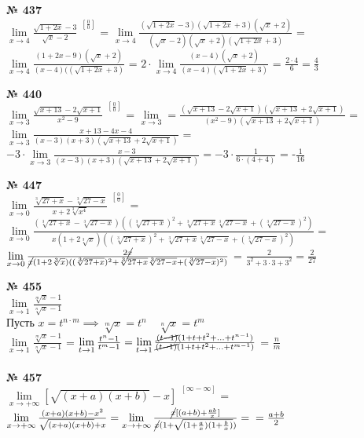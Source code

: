 \documentclass[12pt]{article}
\begin{document}
{
	{\textbf{№ 437} \vspace{.5cm}\\}
	\Large{ $\lim\limits_{x \to 4} \frac{\sqrt{1+2x}-3}{\sqrt{x}-2}^{\enspace [\frac{0}{0}]}$ = 
		$\lim\limits_{x \to 4} \frac{(\sqrt{1+2x}-3)(\sqrt{1+2x}+3)(\sqrt{x}+2)}{(\sqrt{x}-2)(\sqrt{x}+2)(\sqrt{1+2x}+3)}$ = $\lim\limits_{x \to 4} \frac{(1+2x-9)(\sqrt{x}+2)}{(x-4)((\sqrt{1+2x}+3)}$ = 
		$2 \cdot \lim\limits_{x \to 4} \frac{(x-4)(\sqrt{x}+2)}{(x-4)(\sqrt{1+2x}+3)}$ = $\frac{2 \cdot 4}{6} = \frac{4}{3}$\\
	}
}

\vspace{.5cm}
{
	{\textbf{№ 440} \vspace{.5cm}\\}
	\Large{ $\lim\limits_{x \to 3} \frac{\sqrt{x+13} - 2 \sqrt{x+1}}{x^2-9}^{\enspace [\frac{0}{0}]}$ = $\lim\limits_{x \to 3} = \frac{(\sqrt{x+13} - 2 \sqrt{x+1})(\sqrt{x+13} + 2 \sqrt{x+1})}{(x^2-9)(\sqrt{x+13} + 2 \sqrt{x+1})}$ = $\lim\limits_{x \to 3} \frac{x+13 - 4x - 4}{(x-3)(x+3)(\sqrt{x+13} + 2 \sqrt{x+1})}$ = $-3 \cdot \lim\limits_{x \to 3} \frac{x-3}{(x-3)(x+3)(\sqrt{x+13} + 2 \sqrt{x+1})} = -3 \cdot \frac{1}{6 \cdot (4 + 4)}$ =
		-$\frac{1}{16}$\\
	}
}

\vspace{.5cm}
{
	{\textbf{№ 447} \vspace{.5cm}\\}
	\large{ $\lim\limits_{x \to 0} \frac{\sqrt[3]{27+x}-\sqrt[3]{27-x}}{x+2\sqrt[3]{x^4}}^{\enspace [\frac{0}{0}]}$ = 
		$\lim\limits_{x \to 0} \frac{(\sqrt[3]{27+x}-\sqrt[3]{27-x})((\sqrt[3]{27+x})^2 + \sqrt[3]{27+x}\sqrt[3]{27-x} + (\sqrt[3]{27-x})^2)}{x(1+2\sqrt[3]{x})((\sqrt[3]{27+x})^2 + \sqrt[3]{27+x}\sqrt[3]{27-x} + (\sqrt[3]{27-x})^2)}$ = $\lim\limits_{x \to 0} 
		\frac{2 \cancel{x}}{\cancel{x}(1+2\sqrt[3]{x})((\sqrt[3]{27+x})^2 + \sqrt[3]{27+x}\sqrt[3]{27-x} + (\sqrt[3]{27-x})^2)}$ = $\frac{2}{3^2+3 \cdot 3 + 3^2} = \frac{2}{27}$\\
	}
}
\newpage

{
	{\textbf{№ 455} \vspace{.5cm}\\}
	\large{ $\lim\limits_{x \to 1}\frac{\sqrt[m]{x}-1}{\sqrt[n]{x}-1}$\\
	Пусть $x = t^{n \cdot m} \implies \sqrt[m]{x}=t^n \quad \sqrt[n]{x}=t^m$\\
	$\lim\limits_{x \to 1}\frac{\sqrt[m]{x}-1}{\sqrt[n]{x}-1}$ = $\lim\limits_{t \to 1}
	\frac{t^n-1}{t^m-1} = \lim\limits_{t \to 1} \frac{\cancel{(t-1)}(1+t+t^2+...+t^{n-1})}
	{\cancel{(t-1)}(1+t+t^2+...+t^{m-1})}$ = $\frac{n}{m}$\\
	}
}
\vspace{.5cm}\\
{
	{\textbf{№ 457} \vspace{.5cm}\\}
	\large{ $\lim\limits_{x \to +\infty}[\sqrt{(x+a)(x+b)}-x]^{\enspace [\infty - \infty]}$ = $\lim\limits_{x \to +\infty}
		\frac{(x+a)(x+b)-x^2}{\sqrt{(x+a)(x+b)}+x} = \lim\limits_{x \to +\infty} \frac{\cancel{x}[(a+b)+\frac{ab}{x}]}{\cancel{x}(1+\sqrt{(1+\frac{a}{x})(1+\frac{b}{x})})} =\\ =\frac{a+b}{2}$
	}
}
\end{document}
